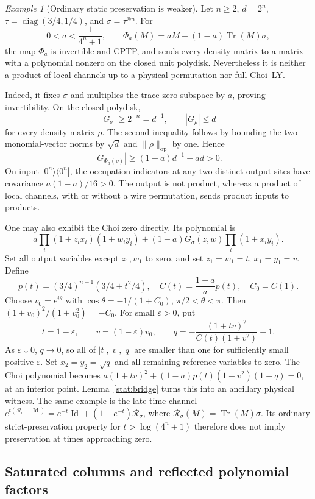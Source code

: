 \documentclass[reqno]{amsart}
\theoremstyle{definition}
\theoremstyle{remark}
\newtheorem{example}[theorem]{Example}
\DeclareMathOperator{\Tr}{Tr}
\DeclareMathOperator{\Id}{Id}
\DeclareMathOperator{\diag}{diag}
\begin{document}
\begin{example}[Ordinary static preservation is weaker]
\label{stat:ordinary-counterexample}
Let \(n\ge2\), \(d=2^n\),
\(\tau=\diag(3/4,1/4)\), and \(\sigma=\tau^{\otimes n}\).
For
\[
 0<a<\frac1{4^n+1},\qquad
 \Phi_a(M)=aM+(1-a)\Tr(M)\sigma,
\]
the map \(\Phi_a\) is invertible and CPTP, and sends every density
matrix to a matrix with a polynomial nonzero on the closed unit
polydisk.  Nevertheless it is neither a product of local channels
up to a physical permutation nor full Choi--LY.

Indeed, it fixes \(\sigma\) and multiplies the trace-zero subspace
by \(a\), proving invertibility.  On the closed polydisk,
\[
 |G_\sigma|\ge2^{-n}=d^{-1},\qquad |G_\rho|\le d
\]
for every density matrix \(\rho\).  The second inequality follows
by bounding the two monomial-vector norms by \(\sqrt d\) and
\(\|\rho\|_{\mathrm{op}}\) by one.  Hence
\[
 |G_{\Phi_a(\rho)}|\ge(1-a)d^{-1}-ad>0.
\]
On input \(|0^n\rangle\langle0^n|\), the occupation indicators at
any two distinct output sites have covariance \(a(1-a)/16>0\).
The output is not product, whereas a product of local channels,
with or without a wire permutation, sends product inputs to products.

One may also exhibit the Choi zero directly.  Its polynomial is
\[
 a\prod_i(1+z_ix_i)(1+w_iy_i)
 +(1-a)G_\sigma(z,w)\prod_i(1+x_iy_i).
\]
Set all output variables except \(z_1,w_1\) to zero, and set
\(z_1=w_1=t\), \(x_1=y_1=v\).  Define
\[
 p(t)=(3/4)^{n-1}(3/4+t^2/4),\quad
 C(t)=\frac{1-a}{a}p(t),\quad C_0=C(1).
\]
Choose \(v_0=e^{i\theta}\) with
\(\cos\theta=-1/(1+C_0)\), \(\pi/2<\theta<\pi\).  Then
\((1+v_0)^2/(1+v_0^2)=-C_0\).
For small \(\varepsilon>0\), put
\[
 t=1-\varepsilon,\qquad v=(1-\varepsilon)v_0,
 \qquad q=-\frac{(1+tv)^2}{C(t)(1+v^2)}-1.
\]
As \(\varepsilon\downarrow0\), \(q\to0\), so all of
\(|t|,|v|,|q|\) are smaller than one for sufficiently small
positive \(\varepsilon\).  Set \(x_2=y_2=\sqrt q\) and all
remaining reference variables to zero.  The Choi polynomial becomes
\(a(1+tv)^2+(1-a)p(t)(1+v^2)(1+q)=0\), at an interior point.
Lemma~\ref{stat:bridge} turns this into an ancillary physical witness.
The same example is the late-time channel
\(e^{t(\mathcal R_\sigma-\Id)}=e^{-t}\Id+(1-e^{-t})\mathcal R_\sigma\),
where \(\mathcal R_\sigma(M)=\Tr(M)\sigma\).  Its ordinary
strict-preservation property for \(t>\log(4^n+1)\) therefore does
not imply preservation at times approaching zero.
\end{example}

\subsection{Saturated columns and reflected polynomial factors}
\end{document}
